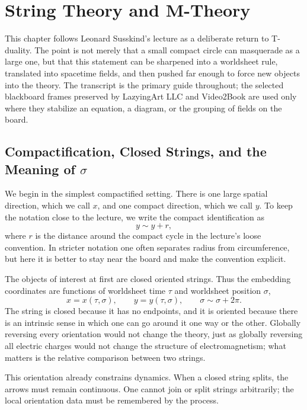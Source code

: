 \chapter{String Theory and M-Theory}

This chapter follows Leonard Susskind's lecture as a deliberate return to T-duality. The point is not merely that a small compact circle can masquerade as a large one, but that this statement can be sharpened into a worldsheet rule, translated into spacetime fields, and then pushed far enough to force new objects into the theory. The transcript is the primary guide throughout; the selected blackboard frames preserved by LazyingArt LLC and Video2Book are used only where they stabilize an equation, a diagram, or the grouping of fields on the board.

\section{Compactification, Closed Strings, and the Meaning of \(\sigma\)}

We begin in the simplest compactified setting. There is one large spatial direction, which we call \(x\), and one compact direction, which we call \(y\). To keep the notation close to the lecture, we write the compact identification as
\begin{equation}
y \sim y+r,
\end{equation}
where \(r\) is the distance around the compact cycle in the lecture's loose convention. In stricter notation one often separates radius from circumference, but here it is better to stay near the board and make the convention explicit.

The objects of interest at first are closed oriented strings. Thus the embedding coordinates are functions of worldsheet time \(\tau\) and worldsheet position \(\sigma\),
\begin{equation}
x=x(\tau,\sigma), \qquad y=y(\tau,\sigma), \qquad \sigma \sim \sigma+2\pi.
\end{equation}
The string is closed because it has no endpoints, and it is oriented because there is an intrinsic sense in which one can go around it one way or the other. Globally reversing every orientation would not change the theory, just as globally reversing all electric charges would not change the structure of electromagnetism; what matters is the relative comparison between two strings.

This orientation already constrains dynamics. When a closed string splits, the arrows must remain continuous. One cannot join or split strings arbitrarily; the local orientation data must be remembered by the process.

